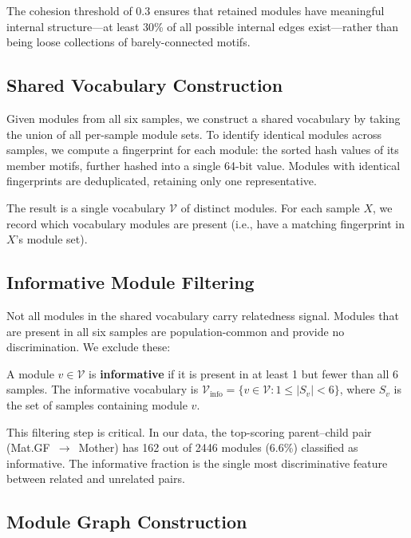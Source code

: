 \documentclass{../yalumba}
\begin{document}
The cohesion threshold of $0.3$ ensures that retained modules have meaningful
internal structure---at least 30\% of all possible internal edges exist---rather
than being loose collections of barely-connected motifs.

\subsection{Shared Vocabulary Construction}


Given modules from all six samples, we construct a shared vocabulary by taking
the union of all per-sample module sets.  To identify identical modules across
samples, we compute a fingerprint for each module: the sorted hash values of
its member motifs, further hashed into a single 64-bit value.  Modules with
identical fingerprints are deduplicated, retaining only one representative.

The result is a single vocabulary $\mathcal{V}$ of distinct modules.  For each
sample $X$, we record which vocabulary modules are present (i.e., have a
matching fingerprint in $X$'s module set).

\subsection{Informative Module Filtering}

Not all modules in the shared vocabulary carry relatedness signal.  Modules
that are present in all six samples are population-common and provide no
discrimination.  We exclude these:

\begin{definition}
A module $v \in \mathcal{V}$ is \textbf{informative} if it is present in
at least 1 but fewer than all 6 samples.  The informative vocabulary is
$\mathcal{V}_{\text{info}} = \{v \in \mathcal{V} : 1 \leq |S_v| < 6\}$,
where $S_v$ is the set of samples containing module $v$.
\end{definition}

This filtering step is critical.  In our data, the top-scoring parent--child
pair (Mat.GF~$\to$~Mother) has 162 out of 2446 modules (6.6\%) classified as
informative.  The informative fraction is the single most discriminative
feature between related and unrelated pairs.

\subsection{Module Graph Construction}
\end{document}
